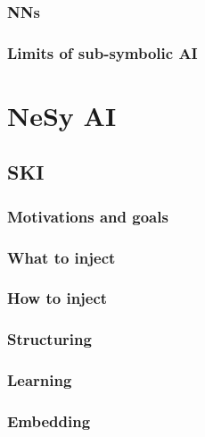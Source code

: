 \documentclass[12pt,a4paper,openright,twoside]{book}
\begin{document}
\subsection{\Aclp{NN}}\label{subsec:neural-networks}

\subsection{Limits of sub-symbolic \ac{AI}}\label{subsec:limits-of-sub-symbolic-ai}


\chapter{\Acl{NeSy} \ac{AI}}\label{ch:nesy-ai}

\section{\Acl{SKI}}\label{sec:ski}

\subsection{Motivations and goals}\label{subsec:ski-motivations-and-goals}

\subsection{What to inject}\label{subsec:what-to-inject}

\subsection{How to inject}\label{subsec:how-to-inject}

\subsection{Structuring}\label{subsec:structuring}

\subsection{Learning}\label{subsec:learning}

\subsection{Embedding}\label{subsec:ski-embedding}
\end{document}
